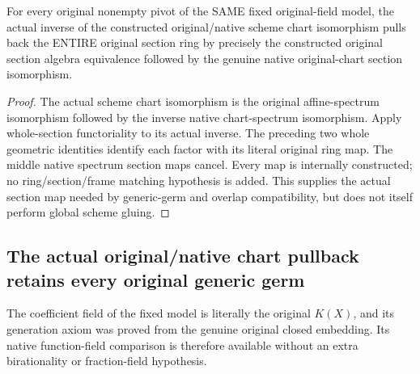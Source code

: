 \begin{theorem}
\label{thm:seven-fixed-original-native-chart-whole-pullbacks-route}
\leanok
{}
For every original nonempty pivot of the SAME fixed original-field model,
the actual inverse of the constructed original/native scheme chart
isomorphism pulls back the ENTIRE original section ring by precisely the
constructed original section algebra equivalence followed by the genuine
native original-chart section isomorphism.
\end{theorem}
\begin{proof}
The actual scheme chart isomorphism is the original affine-spectrum
isomorphism followed by the inverse native chart-spectrum isomorphism.
Apply whole-section functoriality to its actual inverse. The preceding two
whole geometric identities identify each factor with its literal original
ring map. The middle native spectrum section maps cancel. Every map is
internally constructed; no ring/section/frame matching hypothesis is added.
This supplies the actual section map needed by generic-germ and overlap
compatibility, but does not itself perform global scheme gluing.
\end{proof}

\subsection{The actual original/native chart pullback retains every original generic germ}
The coefficient field of the fixed model is literally the original $K(X)$,
and its generation axiom was proved from the genuine original closed
embedding. Its native function-field comparison is therefore available
without an extra birationality or fraction-field hypothesis.

